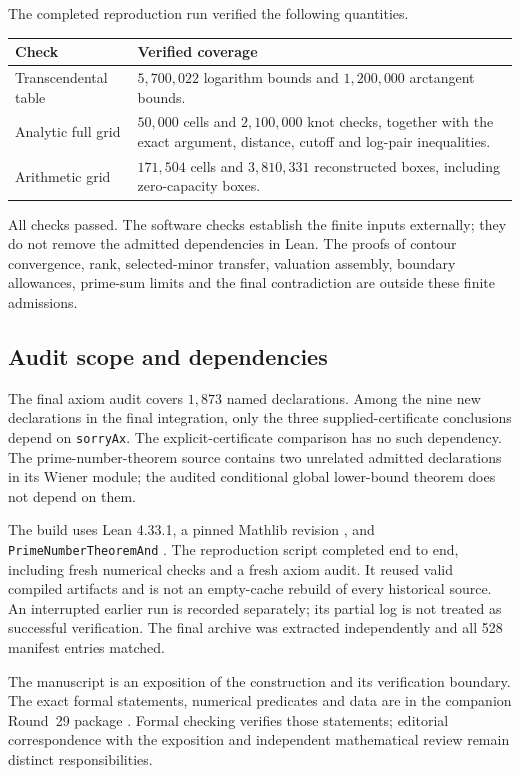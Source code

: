 The completed reproduction run verified the following quantities.
\begin{center}\small
\begin{tabular}{p{}p{}}
\toprule Check & Verified coverage\\\midrule
Transcendental table & $5{,}700{,}022$ logarithm bounds and $1{,}200{,}000$ arctangent bounds.\\[4pt]
Analytic full grid & $50{,}000$ cells and $2{,}100{,}000$ knot checks, together with the exact argument, distance, cutoff and log-pair inequalities.\\[4pt]
Arithmetic grid & $171{,}504$ cells and $3{,}810{,}331$ reconstructed boxes, including zero-capacity boxes.\\
\bottomrule
\end{tabular}
\end{center}
All checks passed. The software checks establish the finite inputs
externally; they do not remove the admitted dependencies in Lean.
The proofs of contour convergence, rank, selected-minor transfer, valuation
assembly, boundary allowances, prime-sum limits and the final contradiction
are outside these finite admissions.

\subsection{Audit scope and dependencies}
The final axiom audit covers $1{,}873$ named declarations. Among the nine
new declarations in the final integration, only the three supplied-certificate
conclusions depend on \texttt{sorryAx}. The explicit-certificate comparison
has no such dependency. The prime-number-theorem source contains two
unrelated admitted declarations in its Wiener module; the audited
conditional global lower-bound theorem does not depend on them.

The build uses Lean 4.33.1, a pinned Mathlib revision \cite{Mathlib}, and
\texttt{PrimeNumberTheoremAnd} \cite{PNT}. The reproduction script completed
end to end, including fresh numerical checks and a fresh axiom audit.
It reused valid compiled artifacts and is not an empty-cache rebuild of
every historical source. An interrupted earlier run is recorded separately;
its partial log is not treated as successful verification. The final
archive was extracted independently and all 528 manifest entries matched.

The manuscript is an exposition of the construction and its verification
boundary. The exact formal statements, numerical predicates and data are
in the companion Round~29 package \cite{Project}. Formal checking verifies
those statements; editorial correspondence with the exposition and
independent mathematical review remain distinct responsibilities.

